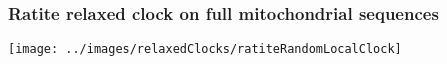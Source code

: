 \begin{frame}
\frametitle{Ratite relaxed clock on full mitochondrial sequences}

\begin{centering}

\texttt{[image: ../images/relaxedClocks/ratiteRandomLocalClock]}

\end{centering}

\end{frame}
